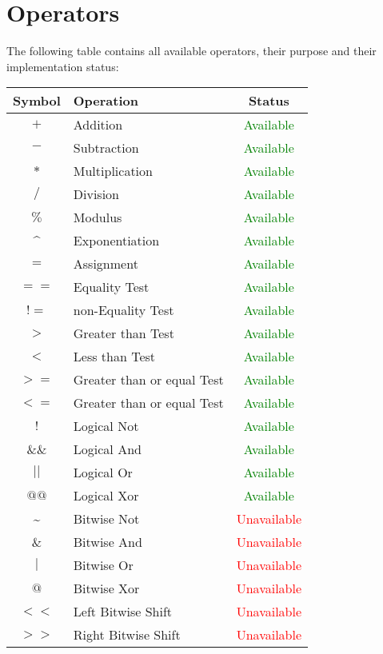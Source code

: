 \documentclass{standalone}
\begin{document}
	\section{Operators}
		The following table contains all available operators, their purpose and their implementation status:\\
		\begin{tabular}{| c | l | c |}
			\hline
			Symbol & Operation & Status\\
			\hline
			$+$ & Addition & \textcolor{green}{Available} \\
			\hline
			$-$ & Subtraction & \textcolor{green}{Available} \\
			\hline
			$*$ & Multiplication & \textcolor{green}{Available} \\
			\hline
			$/$ & Division & \textcolor{green}{Available} \\
			\hline
			$\%$ & Modulus & \textcolor{green}{Available} \\
			\hline
			\^{} & Exponentiation & \textcolor{green}{Available} \\
			\hline
			$=$ & Assignment & \textcolor{green}{Available} \\
			\hline
			$==$ & Equality Test & \textcolor{green}{Available} \\
			\hline
			$!=$ & non-Equality Test & \textcolor{green}{Available} \\
			\hline
			$>$ & Greater than Test & \textcolor{green}{Available} \\
			\hline
			$<$ & Less than Test & \textcolor{green}{Available} \\
			\hline
			$>=$ & Greater than or equal Test & \textcolor{green}{Available} \\
			\hline
			$<=$ & Greater than or equal Test & \textcolor{green}{Available} \\
			\hline
			$!$ & Logical Not & \textcolor{green}{Available} \\
			\hline
			$\&\&$ & Logical And & \textcolor{green}{Available} \\
			\hline
			$||$ & Logical Or & \textcolor{green}{Available} \\
			\hline
			$@@$ & Logical Xor & \textcolor{green}{Available} \\
			\hline
			\~{} & Bitwise Not & \textcolor{red}{Unavailable} \\
			\hline
			$\&$ & Bitwise And & \textcolor{red}{Unavailable} \\
			\hline
			$|$ & Bitwise Or & \textcolor{red}{Unavailable} \\
			\hline
			$@$ & Bitwise Xor & \textcolor{red}{Unavailable} \\
			\hline
			$<<$ & Left Bitwise Shift & \textcolor{red}{Unavailable} \\
			\hline
			$>>$ & Right Bitwise Shift & \textcolor{red}{Unavailable} \\
			\hline
		\end{tabular}
\end{document}
